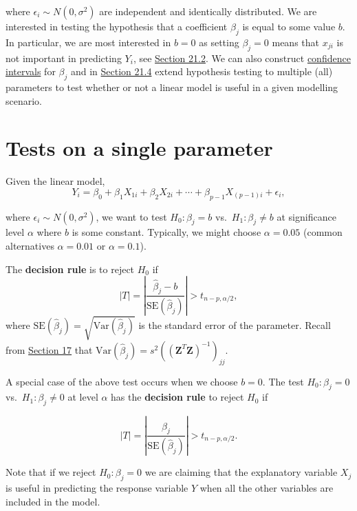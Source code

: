 \documentclass[
]{book}
\begin{document}
where \(\epsilon_i \sim N(0,\sigma^2)\) are independent and identically distributed. We are interested in testing the hypothesis that a coefficient \(\beta_j\) is equal to some value \(b\). In particular, we are most interested in \(b=0\) as setting \(\beta_j =0\) means that \(x_{ji}\) is not important in predicting \(Y_i\), see \protect\hyperlink{Sec_Linear_hypo_test:single}{Section 21.2}. We can also construct \protect\hyperlink{Sec_Linear_hypo_test:CI}{confidence intervals} for \(\beta_j\) and in \protect\hyperlink{Sec_Linear_hypo_test:F}{Section 21.4} extend hypothesis testing to multiple (all) parameters to test whether or not a linear model is useful in a given modelling scenario.

\hypertarget{Sec_Linear_hypo_test:single}{%
\section{Tests on a single parameter}\label{Sec_Linear_hypo_test:single}}

Given the linear model,\\

\[ Y_i = \beta_0 + \beta_1 X_{1i} + \beta_2 X_{2i} + \cdots + \beta_{p-1} X_{(p-1)i} + \epsilon_i,\]

where \(\epsilon_i \sim N(0,\sigma^2)\), we want to test \(H_0: \beta_j = b\) vs.~\(H_1: \beta_j \neq b\) at significance level \(\alpha\) where \(b\) is some constant. Typically, we might choose \(\alpha =0.05\) (common alternatives \(\alpha =0.01\) or \(\alpha =0.1\)).

The {\textbf{decision rule}} is to reject \(H_0\) if
\[|T| = \left| \frac{ \hat{\beta}_j - b}{\text{SE}(\hat{\beta}_j)} \right| > t_{n-p,\alpha/2},\]
where \(\text{SE}(\hat{\beta}_j) = \sqrt{ \text{Var}(\hat{\beta}_j) }\) is the standard error of the parameter. Recall from \protect\hyperlink{Sec_Linear_LSE:beta}{Section 17} that \(\text{Var}(\hat{\beta}_j) = s^2 \left( (\mathbf{Z}^T\mathbf{Z})^{-1} \right)_{jj}\).

A special case of the above test occurs when we choose \(b=0\). The test \(H_0: \beta_j = 0\) vs.~\(H_1: \beta_j \neq 0\) at level \(\alpha\) has the {\textbf{decision rule}} to reject \(H_0\) if

\[|T| = \left| \frac{ \hat{\beta}_j}{\text{SE}(\hat{\beta}_j)} \right| > t_{n-p,\alpha/2}.\]

Note that if we reject \(H_0: \beta_j =0\) we are claiming that the explanatory variable \(X_j\) is useful in predicting the response variable \(Y\) when all the other variables are included in the model.
\end{document}
